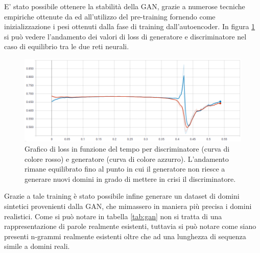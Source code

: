 E' stato possibile ottenere la stabilità della GAN, grazie a numerose tecniche empiriche ottenute da \cite{1606.03498} ed all'utilizzo del pre-training fornendo come inizializzazione i pesi ottenuti dalla fase di training dall'autoencoder. In figura \ref{fig:ganok} si può vedere l'andamento dei valori di loss di generatore e discriminatore nel caso di equilibrio tra le due reti neurali.

\begin{figure}[!bp]
\centering
\includegraphics[width=\columnwidth]{figures/gan/ganok.png}
\caption{Grafico di loss in funzione del tempo per discriminatore (curva di colore rosso) e generatore (curva di colore azzurro). L'andamento rimane equilibrato fino al punto in cui il generatore non riesce a generare nuovi domini in grado di mettere in crisi il discriminatore. \label{fig:ganok}}
\end{figure}

Grazie a tale training è stato possibile infine generare un dataset di domini sintetici provenienti dalla GAN, che mimassero in maniera più precisa i domini realistici. Come si può notare in tabella \ref{tab:gan} non si tratta di una rappresentazione di parole realmente esistenti, tuttavia si può notare come siano presenti n-grammi realmente esistenti oltre che ad una lunghezza di sequenza simile a domini reali.

